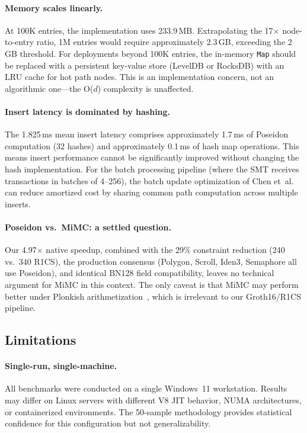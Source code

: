 \paragraph{Memory scales linearly.} At 100K entries, the implementation uses 233.9\,MB. Extrapolating the 17$\times$ node-to-entry ratio, 1M entries would require approximately 2.3\,GB, exceeding the 2\,GB threshold. For deployments beyond 100K entries, the in-memory \texttt{Map} should be replaced with a persistent key-value store (LevelDB or RocksDB) with an LRU cache for hot path nodes. This is an implementation concern, not an algorithmic one---the O($d$) complexity is unaffected.

\paragraph{Insert latency is dominated by hashing.} The 1.825\,ms mean insert latency comprises approximately 1.7\,ms of Poseidon computation (32 hashes) and approximately 0.1\,ms of hash map operations. This means insert performance cannot be significantly improved without changing the hash implementation. For the batch processing pipeline (where the SMT receives transactions in batches of 4--256), the batch update optimization of Chen et~al.~\cite{chen2023batch} can reduce amortized cost by sharing common path computation across multiple inserts.

\paragraph{Poseidon vs.\ MiMC: a settled question.} Our 4.97$\times$ native speedup, combined with the 29\% constraint reduction (240 vs.\ 340 R1CS), the production consensus (Polygon, Scroll, Iden3, Semaphore all use Poseidon), and identical BN128 field compatibility, leaves no technical argument for MiMC in this context. The only caveat is that MiMC may perform better under Plonkish arithmetization~\cite{guohanze2024benchmarking}, which is irrelevant to our Groth16/R1CS pipeline.

\subsection{Limitations}

\paragraph{Single-run, single-machine.} All benchmarks were conducted on a single Windows~11 workstation. Results may differ on Linux servers with different V8 JIT behavior, NUMA architectures, or containerized environments. The 50-sample methodology provides statistical confidence for this configuration but not generalizability.

